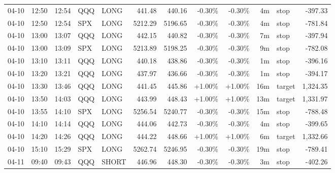 \documentclass[11pt,a4paper]{article}
\begin{document}
\begin{center}
\begin{longtable}{>{\color{txtmain}}l l l l l r r r r r >{\color{txtmain}}l r}
04-10 & 12:50 & 12:54 & QQQ & LONG & 441.48 & 440.16 & \textcolor{lossred}{-0.30\%} & \textcolor{lossred}{-0.30\%} & 4m & stop & \textcolor{lossred}{-397.33} \\
04-10 & 12:50 & 12:54 & SPX & LONG & 5212.29 & 5196.65 & \textcolor{lossred}{-0.30\%} & \textcolor{lossred}{-0.30\%} & 4m & stop & \textcolor{lossred}{-781.84} \\
04-10 & 13:00 & 13:07 & QQQ & LONG & 442.15 & 440.82 & \textcolor{lossred}{-0.30\%} & \textcolor{lossred}{-0.30\%} & 7m & stop & \textcolor{lossred}{-397.94} \\
04-10 & 13:00 & 13:09 & SPX & LONG & 5213.89 & 5198.25 & \textcolor{lossred}{-0.30\%} & \textcolor{lossred}{-0.30\%} & 9m & stop & \textcolor{lossred}{-782.08} \\
04-10 & 13:10 & 13:11 & QQQ & LONG & 440.18 & 438.86 & \textcolor{lossred}{-0.30\%} & \textcolor{lossred}{-0.30\%} & 1m & stop & \textcolor{lossred}{-396.16} \\
04-10 & 13:20 & 13:21 & QQQ & LONG & 437.97 & 436.66 & \textcolor{lossred}{-0.30\%} & \textcolor{lossred}{-0.30\%} & 1m & stop & \textcolor{lossred}{-394.17} \\
04-10 & 13:30 & 13:46 & QQQ & LONG & 441.45 & 445.86 & \textcolor{wingreen}{+1.00\%} & \textcolor{wingreen}{+1.00\%} & 16m & target & \textcolor{wingreen}{1,324.35} \\
04-10 & 13:50 & 14:03 & QQQ & LONG & 443.99 & 448.43 & \textcolor{wingreen}{+1.00\%} & \textcolor{wingreen}{+1.00\%} & 13m & target & \textcolor{wingreen}{1,331.97} \\
04-10 & 13:55 & 14:10 & SPX & LONG & 5256.54 & 5240.77 & \textcolor{lossred}{-0.30\%} & \textcolor{lossred}{-0.30\%} & 15m & stop & \textcolor{lossred}{-788.48} \\
04-10 & 14:10 & 14:14 & QQQ & LONG & 444.06 & 442.73 & \textcolor{lossred}{-0.30\%} & \textcolor{lossred}{-0.30\%} & 4m & stop & \textcolor{lossred}{-399.65} \\
04-10 & 14:20 & 14:26 & QQQ & LONG & 444.22 & 448.66 & \textcolor{wingreen}{+1.00\%} & \textcolor{wingreen}{+1.00\%} & 6m & target & \textcolor{wingreen}{1,332.66} \\
04-10 & 15:10 & 15:29 & SPX & LONG & 5262.74 & 5246.95 & \textcolor{lossred}{-0.30\%} & \textcolor{lossred}{-0.30\%} & 19m & stop & \textcolor{lossred}{-789.41} \\
04-11 & 09:40 & 09:43 & QQQ & SHORT & 446.96 & 448.30 & \textcolor{lossred}{-0.30\%} & \textcolor{lossred}{-0.30\%} & 3m & stop & \textcolor{lossred}{-402.26} \\

\end{longtable}
\end{center}
\end{document}
